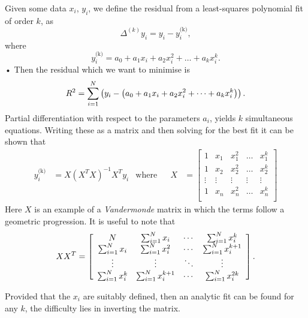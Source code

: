 Given some data $x_{i}$, $y_{i}$, we define the residual from a least-squares
polynomial fit of order $k$, as
\begin{equation}
    \Delta^{(k)}y_{i} = y_{i} - y^{\textrm{(k)}}_{i},
\end{equation}
where
\begin{equation}
y^{\textrm{(k)}}_{i} = a_{0} + a_{1}x_{i} + a_{2}x_{i}^{2} + \dots
                                                           + a_{k} x_{i}^{k}.
\end{equation}•
Then the residual which we want to minimise is
\begin{equation}
R^{2} = \sum_{i=1}^{N}\left(y_{i} - \left(a_{0} + a_{1}x_{i} + a_{2}x_{i}^{2} +
        \dots + a_{k} x_{i}^{k}\right)\right).
\end{equation}
Partial differentiation with respect to the parameters $a_{i}$, yields $k$
simultaneous equations. Writing these as a matrix and then solving
for the best fit it can be shown \citep{WolframLeastSquares} that
\begin{align}
y^{\textrm{(k)}}_{i} & = X \left(X^{T}X\right)^{-1} X^{T} y_{i} & \textrm{where} & &
X & = \left[\begin{array}{ccccc}
1 & x_{1} & x_{1}^{2} & \dots & x_{1}^{k} \\
1 & x_{2} & x_{2}^{2} & \dots & x_{2}^{k} \\
\vdots & \vdots & \vdots & \vdots & \vdots \\
1 & x_{n} & x_{n}^{2} & \dots & x_{n}^{k} \\
\end{array}\right]
\end{align}
Here $X$ is an example of a \emph{Vandermonde} matrix in which the terms follow
a geometric progression. It is useful to note that
\begin{equation}
XX^{T} = \left[\begin{array}{cccc}
N & \sum_{i=1}^{N}x_{i} & \cdots &  \sum_{i=1}^{N}x_{i}^{k} \\
\sum_{i=1}^{N}x_{i} & \sum_{i=1}^{N}x_{i}^{2} & \cdots &  \sum_{i=1}^{N}x_{i}^{k+1} \\
\vdots & \vdots & \ddots & \vdots \\
\sum_{i=1}^{N}x_{i}^{k} & \sum_{i=1}^{N}x_{i}^{k+1} & \cdots &  \sum_{i=1}^{N}x_{i}^{2k}
\end{array}\right].
\end{equation}

Provided that the $x_{i}$ are suitably defined, then an analytic fit can be
found for any $k$, the difficulty lies in inverting the matrix.

